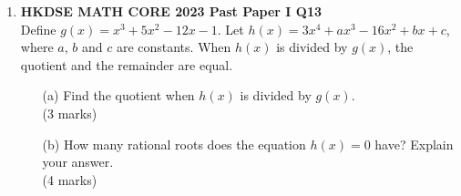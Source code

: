 \documentclass[12pt]{article}
\begin{document}
\begin{enumerate}
	\item \textbf{HKDSE MATH CORE 2023 Past Paper I Q13}\\
	Define $g(x) = x^3 + 5x^2 - 12x - 1$. Let $h(x) = 3x^4 + ax^3 - 16x^2 + bx + c$, where $a$, $b$ and $c$ are constants. When $h(x)$ is divided by $g(x)$, the quotient and the remainder are equal.
	\begin{enumerate}
		\item[(a)] Find the quotient when $h(x)$ is divided by $g(x)$. \\(3 marks)
		\item[(b)] How many rational roots does the equation $h(x) = 0$ have? Explain your answer. \\(4 marks)
	\end{enumerate}




\end{enumerate}
\end{document}
